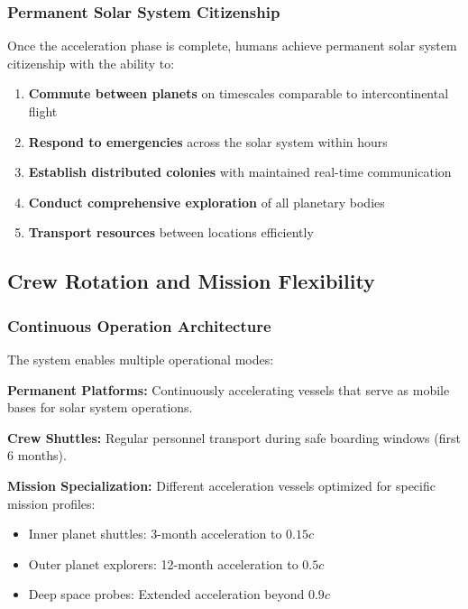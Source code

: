 \documentclass[11pt,a4paper]{article}
\theoremstyle{remark}
\begin{document}
\subsubsection{Permanent Solar System Citizenship}

Once the acceleration phase is complete, humans achieve permanent solar system citizenship with the ability to:

\begin{enumerate}
\item \textbf{Commute between planets} on timescales comparable to intercontinental flight
\item \textbf{Respond to emergencies} across the solar system within hours
\item \textbf{Establish distributed colonies} with maintained real-time communication
\item \textbf{Conduct comprehensive exploration} of all planetary bodies
\item \textbf{Transport resources} between locations efficiently
\end{enumerate}

\subsection{Crew Rotation and Mission Flexibility}

\subsubsection{Continuous Operation Architecture}

The system enables multiple operational modes:

\textbf{Permanent Platforms:} Continuously accelerating vessels that serve as mobile bases for solar system operations.

\textbf{Crew Shuttles:} Regular personnel transport during safe boarding windows (first 6 months).

\textbf{Mission Specialization:} Different acceleration vessels optimized for specific mission profiles:
\begin{itemize}
\item Inner planet shuttles: 3-month acceleration to $0.15c$
\item Outer planet explorers: 12-month acceleration to $0.5c$
\item Deep space probes: Extended acceleration beyond $0.9c$
\end{itemize}
\end{document}
